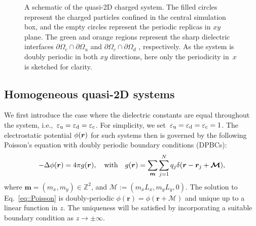 \begin{figure}[htbp]
    \caption{
        A schematic of the quasi-2D charged system.
        The filled circles represent the charged particles confined in the central simulation box, and the empty circles represent the periodic replicas in $xy$ plane.
        The green and orange regions represent the sharp dielectric interfaces $\partial \Omega_c \cap \partial \Omega_{u}$ and $\partial \Omega_c \cap \partial \Omega_{d}$ , respectively.
        As the system is doubly periodic in both $xy$ directions, here only the periodicity in~$x$ is sketched for clarity.
    }
    \label{fig:box}
\end{figure}

\subsection{Homogeneous quasi-2D systems}

We first introduce the case where the dielectric constants are equal throughout the system, i.e.,~$\varepsilon_{\mathrm{u}} = \varepsilon_{\mathrm{d}} = \varepsilon_{\mathrm{c}}$. For simplicity, we set~$\varepsilon_{\mathrm{u}} = \varepsilon_{\mathrm{d}} = \varepsilon_{\mathrm{c}} = 1$.
The electrostatic potential $\phi(\boldsymbol{r})$ for such systems then is governed by the following Poisson's equation with doubly periodic boundary conditions (DPBCs):
\begin{equation}\label{eq::Poisson}
	-\Delta\phi(\bm{r}) = 4\pi g(\bm{r}), \quad \text{with} \quad g(\bm{r})= \sum_{\V{m}}\sum_{j=1}^{N}q_{j}\delta(\bm{r}-\bm{r}_{j}+\bm{\mathcal{M}}),%
\end{equation}
where $\bm{m}=(m_x,m_y) \in\mathbb{Z}^2$, and $\bm{\mathcal{M}} := (m_x L_x, m_y L_y, 0)$.
The solution to Eq.~\eqref{eq::Poisson} is doubly-periodic $\phi(\bm{r})=\phi(\bm{r} + \bm{\mathcal{M}})$ and unique up to a linear function in $z$. The uniqueness will be satisfied by incorporating a suitable boundary condition as $z\to\pm\infty$.

